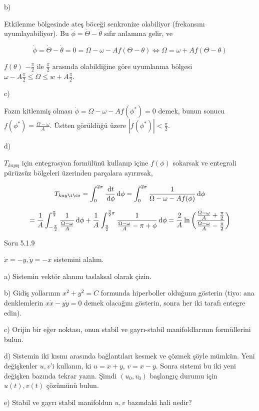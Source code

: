 \documentclass[12pt,fleqn]{article}\usepackage{../../common}
\begin{document}
b)

Etkilenme bölgesinde ateş böceği senkronize olabiliyor (frekansını
uyumlayabiliyor). Bu $\dot{\phi} = \dot{\Theta} - \dot{\theta}$ sıfır anlamına
gelir, ve

$$  \dot{\phi} = \dot{\Theta} - \dot{\theta} = 0 =
\Omega - \omega - A f(\Theta-\theta) \iff
\Omega = \omega + A f(\Theta-\theta)
$$

$f(\theta)$ $-\frac{\pi}{2}$ ile $\frac{\pi}{2}$ arasında olabildiğine göre
uyumlanma bölgesi $\omega - A \frac{\pi}{2} \le \Omega \le w + A
\frac{\pi}{2}$.

c)

Fazın kitlenmiş olması $\dot{\phi} = \Omega - \omega - A f(\phi^*) = 0$ demek,
bunun sonucu $f(\phi^*) = \frac{\Omega - \omega}{A}$. Üstten görüldüğü üzere
$|f(\phi^*)| < \frac{\pi}{2}$. 

d)

$T_{kayış}$ için entegrasyon formülünü kullanıp içine $f(\phi)$ sokarsak ve
entegrali pürüzsüz bölgeleri üzerinden parçalara ayırırsak,

$$ T_{kayış} =
\int _{0}^{2\pi} \frac{\ud t}{\ud \phi} \ud \phi =
\int _{0}^{2\pi} \frac{1}{\Omega - \omega - Af(\phi)} \ud \phi
$$

$$ = \frac{1}{A} \int _{-\frac{\pi}{2}}^{\frac{\pi}{2}}
\frac{1}{\frac{\Omega-\omega}{A}} \,\mathrm{d} \phi +
\frac{1}{A} \int _{\frac{\pi}{2}}^{\frac{3}{2}\pi} \frac{1}{\frac{\Omega-\omega}{A}-\pi+\phi}\,\mathrm{d}\phi
= \frac{2}{A} \ln \bigg(
\frac
    {\frac{\Omega-\omega}{A} + \frac{\pi}{2}}
    {\frac{\Omega-\omega}{A} - \frac{\pi}{2}}
\bigg)
$$

Soru 5.1.9

$\dot{x} = -y, \dot{y} = -x$ sistemini alalım.

a) Sistemin vektör alanını taslaksal olarak çizin.

b) Gidiş yollarının $x^2+y^2=C$ formunda hiperboller olduğunu gösterin (tiyo:
ana denklemlerin $x\dot{x}-y\dot{y}=0$ demek olacağını gösterin, sonra her iki
tarafı entegre edin).

c) Orijin bir eğer noktası, onun stabil ve gayrı-stabil manifoldlarının
formüllerini bulun.

d) Sistemin iki kısmı arasında bağlantıları kesmek ve çözmek şöyle mümkün. Yeni
değişkenler $u,v$'i kullanın, ki $u=x+y$, $v=x-y$. Sonra sistemi bu iki yeni
değişken bazında tekrar yazın. Şimdi $(u_0,v_0)$ başlangıç durumu için
$u(t),v(t)$ çözümünü bulun.

e) Stabil ve gayrı stabil manifoldun $u,v$ bazındaki hali nedir?
\end{document}
